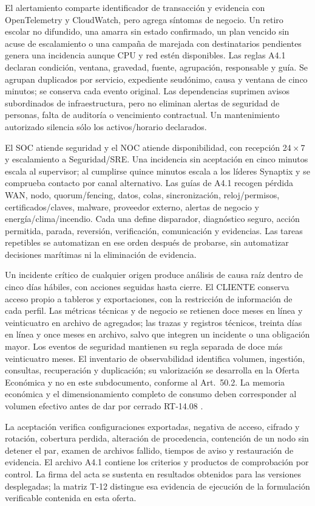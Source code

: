 El alertamiento comparte identificador de transacción y evidencia con OpenTelemetry y CloudWatch, pero agrega síntomas de negocio. Un retiro escolar no difundido, una amarra sin estado confirmado, un plan vencido sin acuse de escalamiento o una campaña de marejada con destinatarios pendientes genera una incidencia aunque CPU y red estén disponibles. Las reglas A4.1 declaran condición, ventana, gravedad, fuente, agrupación, responsable y guía. Se agrupan duplicados por servicio, expediente seudónimo, causa y ventana de cinco minutos; se conserva cada evento original. Las dependencias suprimen avisos subordinados de infraestructura, pero no eliminan alertas de seguridad de personas, falta de auditoría o vencimiento contractual. Un mantenimiento autorizado silencia sólo los activos/horario declarados.

El SOC atiende seguridad y el NOC atiende disponibilidad, con recepción 24\,$\times$\,7 y escalamiento a Seguridad/SRE. Una incidencia sin aceptación en cinco minutos escala al supervisor; al cumplirse quince minutos escala a los líderes Synaptix y se comprueba contacto por canal alternativo. Las guías de A4.1 recogen pérdida WAN, nodo, quorum/fencing, datos, colas, sincronización, reloj/permisos, certificados/claves, malware, proveedor externo, alertas de negocio y energía/clima/incendio. Cada una define disparador, diagnóstico seguro, acción permitida, parada, reversión, verificación, comunicación y evidencias. Las tareas repetibles se automatizan en ese orden después de probarse, sin automatizar decisiones marítimas ni la eliminación de evidencia.

Un incidente crítico de cualquier origen produce análisis de causa raíz dentro de cinco días hábiles, con acciones seguidas hasta cierre. El CLIENTE conserva acceso propio a tableros y exportaciones, con la restricción de información de cada perfil. Las métricas técnicas y de negocio se retienen doce meses en línea y veinticuatro en archivo de agregados; las trazas y registros técnicos, treinta días en línea y once meses en archivo, salvo que integren un incidente o una obligación mayor. Los eventos de seguridad mantienen su regla separada de doce más veinticuatro meses. El inventario de observabilidad identifica volumen, ingestión, consultas, recuperación y duplicación; su valorización se desarrolla en la Oferta Económica y no en este subdocumento, conforme al Art.~50.2. La memoria económica y el dimensionamiento completo de consumo deben corresponder al volumen efectivo antes de dar por cerrado RT-14.08 \parencite[RT-14.01--08, p.~27]{pucv-transversal}.

La aceptación verifica configuraciones exportadas, negativa de acceso, cifrado y rotación, cobertura perdida, alteración de procedencia, contención de un nodo sin detener el par, examen de archivos fallido, tiempos de aviso y restauración de evidencia. El archivo A4.1 contiene los criterios y productos de comprobación por control. La firma del acta se sustenta en resultados obtenidos para las versiones desplegadas; la matriz T-12 distingue esa evidencia de ejecución de la formulación verificable contenida en esta oferta.
